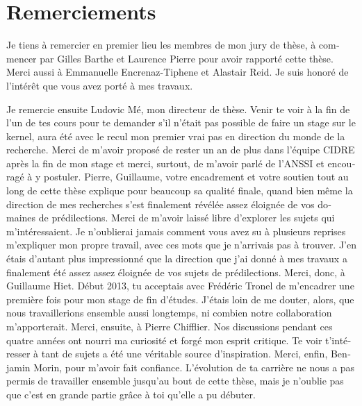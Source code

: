 \chapter*{Remerciements}

\begin{otherlanguage}{french}
  Je tiens à remercier en premier lieu les membres de mon jury de thèse, à
  commencer par Gilles Barthe et Laurence Pierre pour avoir rapporté cette
  thèse. Merci aussi à Emmanuelle Encrenaz-Tiphene et Alastair Reid. Je suis
  honoré de l’intérêt que vous avez porté à mes travaux.

  Je remercie ensuite Ludovic Mé, mon directeur de thèse. Venir te voir à la fin
  de l’un de tes cours pour te demander s’il n’était pas possible de faire un
  stage \og{}sur le kernel\fg{}, aura été avec le recul mon premier vrai pas en
  direction du monde de la recherche. Merci de m’avoir proposé de rester un an
  de plus dans l’équipe CIDRE après la fin de mon stage et merci, surtout, de
  m’avoir parlé de l’ANSSI et encouragé à y postuler.
  Pierre, Guillaume, votre encadrement et votre soutien tout au long de cette
  thèse explique pour beaucoup sa qualité finale, quand bien même la direction
  de mes recherches s’est finalement révélée assez éloignée de vos domaines de
  prédilections. Merci de m’avoir laissé libre d’explorer les sujets qui
  m’intéressaient. Je n’oublierai jamais comment vous avez su à plusieurs
  reprises m’expliquer mon propre travail, avec ces mots que je n'arrivais pas à
  trouver. J’en étais d’autant plus impressionné que la direction que j’ai donné
  à mes travaux a finalement été assez assez éloignée de vos sujets de
  prédilections.
  Merci, donc, à Guillaume Hiet. Début 2013, tu acceptais avec Frédéric Tronel
  de m’encadrer une première fois pour mon stage de fin d’études. J’étais loin
  de me douter, alors, que nous travaillerions ensemble aussi longtemps, ni
  combien notre collaboration m’apporterait.
  Merci, ensuite, à Pierre Chifflier. Nos discussions pendant ces quatre années
  ont nourri ma curiosité et forgé mon esprit critique. Te voir t’intéresser à
  tant de sujets a été une véritable source d’inspiration.
  Merci, enfin, Benjamin Morin, pour m'avoir fait confiance. L’évolution de ta
  carrière ne nous a pas permis de travailler ensemble jusqu’au bout de cette
  thèse, mais je n’oublie pas que c’est en grande partie grâce à toi qu’elle a
  pu débuter.


\end{otherlanguage}
